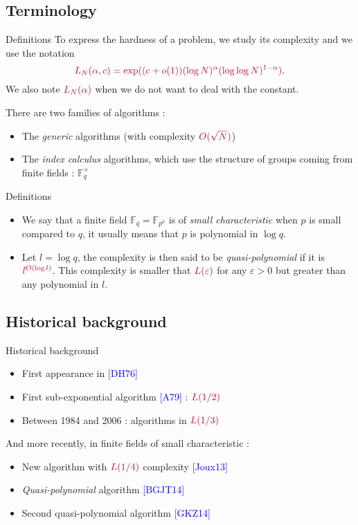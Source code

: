 \documentclass[xcolor=x11names,compress]{beamer}
\theoremstyle{break}
\theoremstyle{sc}
\theoremstyle{definition}
\theoremstyle{remark}
\begin{document}
\subsection{Terminology}
\begin{frame}{Definitions}
  To express the hardness of a problem, we study its complexity and we use the
  notation
  \[
    \textcolor{purple}{L_N(\alpha, c) = \exp((c+o(1))(\log N)^\alpha(\log\log
      N)^{1-\alpha})}.
  \]
  We also note $\textcolor{purple}{L_N(\alpha)}$ when we do not want to deal with the constant.

  There are two families of algorithms :
  \begin{itemize}
    \item The \emph{generic} algorithms (with complexity
      $\textcolor{purple}{O(\sqrt N)}$)
    \item The \emph{index calculus} algorithms, which use the structure
      of groups coming from finite fields : $\mathbb{F}_{q}^\times$
  \end{itemize}
\end{frame}

\begin{frame}{Definitions}
  \begin{itemize}
    \item We say that a finite field $\mathbb{F}_q=\mathbb{F}_{p^k}$ is of
      \emph{small characteristic} when $p$ is small compared to $q$, it usually
      means that $p$ is polynomial in $\log q$.
    \item Let $l = \log q$, the complexity is then said to be
      \emph{quasi-polynomial} if it is
      $\textcolor{purple}{l^{O(\log l)}}$. This complexity is smaller that
      $\textcolor{purple}{L(\varepsilon)}$ for any
  $\varepsilon>0$ but greater than any polynomial in $l$.
  \end{itemize}
\end{frame}

\subsection{Historical background}
\begin{frame}{Historical background}
  \begin{itemize}
    \item First appearance in \textcolor{blue}{[DH76]}
    \item First sub-exponential algorithm \textcolor{blue}{[A79]} :
      $\textcolor{purple}{L(1/2)}$
    \item Between 1984 and 2006 : algorithms in $\textcolor{purple}{L(1/3)}$
\end{itemize}
 And more recently, in finite fields of small characteristic :
  \begin{itemize}
    \item New algorithm with $\textcolor{purple}{L(1/4)}$ complexity
      \textcolor{blue}{[Joux13]}
    \item \emph{Quasi-polynomial} algorithm \textcolor{blue}{[BGJT14]}
    \item Second quasi-polynomial algorithm \textcolor{blue}{[GKZ14]}
  \end{itemize}
\end{frame}
\end{document}
